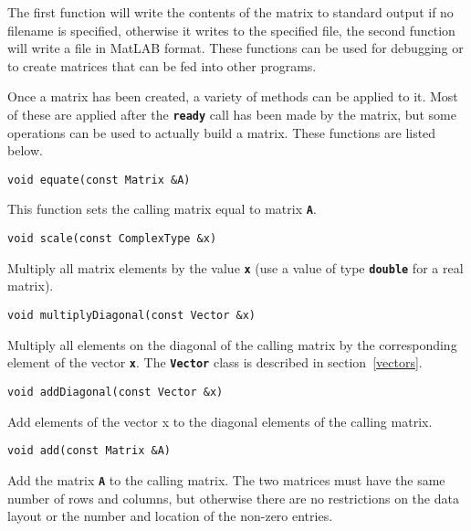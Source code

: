 The first function will write the contents of the matrix to standard output if no filename is specified, otherwise it writes to the specified file, the second function will write a file in MatLAB format. These functions can be used for debugging or to create matrices that can be fed into other programs.

Once a matrix has been created, a variety of methods can be applied to it. Most of these are applied after the \texttt{\textbf{ready}} call has been made by the matrix, but some operations can be used to actually build a matrix. These functions are listed below.

{
\color{red}
\begin{Verbatim}[fontseries=b]
void equate(const Matrix &A)
\end{Verbatim}
}

This function sets the calling matrix equal to matrix \texttt{\textbf{A}}.

{
\color{red}
\begin{Verbatim}[fontseries=b]
void scale(const ComplexType &x)
\end{Verbatim}
}

Multiply all matrix elements by the value \texttt{\textbf{x}} (use a value of type \texttt{\textbf{double}} for a real matrix).

{
\color{red}
\begin{Verbatim}[fontseries=b]
void multiplyDiagonal(const Vector &x)
\end{Verbatim}
}

Multiply all elements on the diagonal of the calling matrix by the corresponding
element of the vector \texttt{\textbf{x}}. The \texttt{\textbf{Vector}} class is
described in section~\ref{vectors}.

{
\color{red}
\begin{Verbatim}[fontseries=b]
void addDiagonal(const Vector &x)
\end{Verbatim}
}

Add elements of the vector x to the diagonal elements of the calling matrix.

{
\color{red}
\begin{Verbatim}[fontseries=b]
void add(const Matrix &A)
\end{Verbatim}
}

Add the matrix \texttt{\textbf{A}} to the calling matrix. The two matrices must have the same number of rows and columns, but otherwise there are no restrictions on the data layout or the number and location of the non-zero entries.


